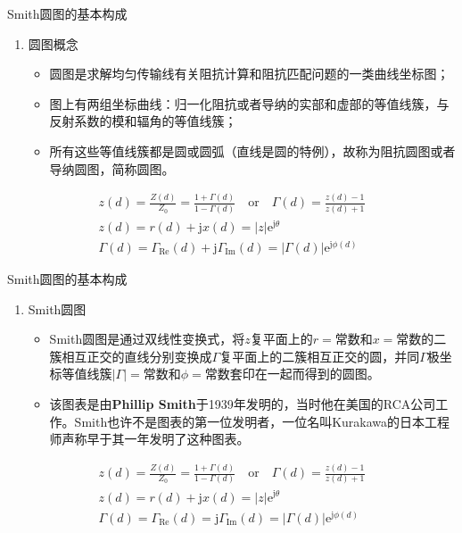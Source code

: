 \begin{frame}{Smith圆图的基本构成}
  \begin{enumerate}
    \item 圆图概念
          \begin{itemize}
            \item 圆图是求解均匀传输线有关阻抗计算和阻抗匹配问题的一类曲线坐标图；
            \item 图上有两组坐标曲线：归一化阻抗或者导纳的实部和虚部的等值线簇，与反射系数的模和辐角的等值线簇；
            \item 所有这些等值线簇都是圆或圆弧（直线是圆的特例），故称为阻抗圆图或者导纳圆图，简称圆图。
          \end{itemize}
          \saveenum
  \end{enumerate}
  \begin{align*}
    z(d)=\frac{Z(d)}{Z_0}=\frac{1+\Gamma(d)}{1-\Gamma(d)}\quad\text{or}\quad\Gamma(d)=\frac{z(d)-1}{z(d)+1} \\
    z(d)=r(d)+\mathrm{j}x(d)=\lvert z\rvert \mathrm{e}^{\mathrm{j}\theta}                                   \\
    \Gamma(d)=\Gamma_{\mathrm{Re}}(d)+\mathrm{j}\Gamma_{\mathrm{Im}}(d)=\lvert\Gamma(d)\rvert \mathrm{e}^{\mathrm{j}\phi(d)}
  \end{align*}
\end{frame}

\begin{frame}{Smith圆图的基本构成}
  \begin{enumerate}
    \resume
    \item Smith圆图
          \begin{itemize}
            \item Smith圆图是通过双线性变换式，将$z$复平面上的$r=$常数和$x=$常数的二簇相互正交的直线分别变换成$\Gamma$复平面上的二簇相互正交的圆，并同$\Gamma$极坐标等值线簇$\lvert\Gamma\rvert=$常数和$\phi=$常数套印在一起而得到的圆图。
            \item 该图表是由\textbf{Phillip Smith}于1939年发明的，当时他在美国的RCA公司工作。Smith也许不是图表的第一位发明者，一位名叫Kurakawa的日本工程师声称早于其一年发明了这种图表。
          \end{itemize}
  \end{enumerate}
  \begin{align*}
    z(d)=\frac{Z(d)}{Z_0}=\frac{1+\Gamma(d)}{1-\Gamma(d)}\quad\text{or}\quad\Gamma(d)=\frac{z(d)-1}{z(d)+1} \\
    z(d)=r(d)+\mathrm{j}x(d)=\lvert z\rvert \mathrm{e}^{\mathrm{j}\theta}                                   \\
    \Gamma(d)=\Gamma_{\mathrm{Re}}(d)=\mathrm{j}\Gamma_{\mathrm{Im}}(d)=\lvert\Gamma(d)\rvert \mathrm{e}^{\mathrm{j}\phi(d)}
  \end{align*}
\end{frame}

